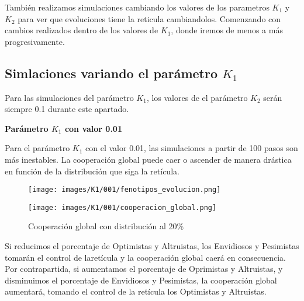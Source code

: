 \documentclass[a4paper,12pt]{report}
\begin{document}
También realizamos simulaciones cambiando los valores de los parametros \( K_1\) y \( K_2\) para ver que evoluciones tiene la reticula cambiandolos.
Comenzando con cambios realizados dentro de los valores de \( K_1\), donde iremos de menos a más progresivamente.

\newpage

\subsection{Simlaciones variando el parámetro \( K_1 \)}

Para las simulaciones del parámetro \( K_1 \), los valores de el parámetro \( K_2 \) serán siempre 0.1 durante este apartado.

\vspace{1.5em}
\noindent\textbf{Parámetro \( K_1 \) con valor 0.01}
\vspace{0.5em}


Para el parámetro \( K_1 \) con el valor 0.01, las simulaciones a partir de 100 pasos son más inestables. La cooperación global puede caer  o ascender de manera drástica en función de la distribución que siga la retícula.

\begin{figure}[h!]
    \centering
    \begin{minipage}{0.49\textwidth}
    \centering
    \texttt{[image: images/K1/001/fenotipos\_evolucion.png]}
    \label{fig:enter-label}
    \end{minipage}
    \hfill
    \begin{minipage}{0.49\textwidth}
    \centering
    \texttt{[image: images/K1/001/cooperacion\_global.png]}
    \label{fig:enter-label}
    \end{minipage}
    \caption{Cooperación global con distribución al 20\%}
\end{figure}

Si reducimos el porcentaje de Optimistas y Altruistas, los Envidiosos y Pesimistas tomarán el control de laretícula y la cooperación global caerá en consecuencia. Por contrapartida, si aumentamos el porcentaje de Oprimistas y Altruistas, y disminuimos el porcentaje de Envidiosos y Pesimistas, la cooperación global aumentará, tomando el control de la retícula los Optimistas y Altruistas.
\end{document}

